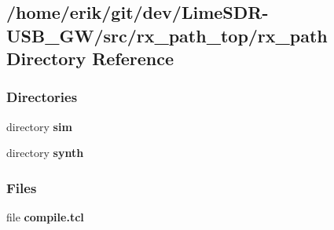 \subsection{/home/erik/git/dev/\+Lime\+S\+D\+R-\/\+U\+S\+B\+\_\+\+G\+W/src/rx\+\_\+path\+\_\+top/rx\+\_\+path Directory Reference}
\label{dir_52d5120555c50c48fe7a45c3625bec6a}
\subsubsection*{Directories}
\begin{DoxyCompactItemize}
\item 
directory {\bf sim}
\item 
directory {\bf synth}
\end{DoxyCompactItemize}
\subsubsection*{Files}
\begin{DoxyCompactItemize}
\item 
file {\bf compile.\+tcl}
\end{DoxyCompactItemize}
